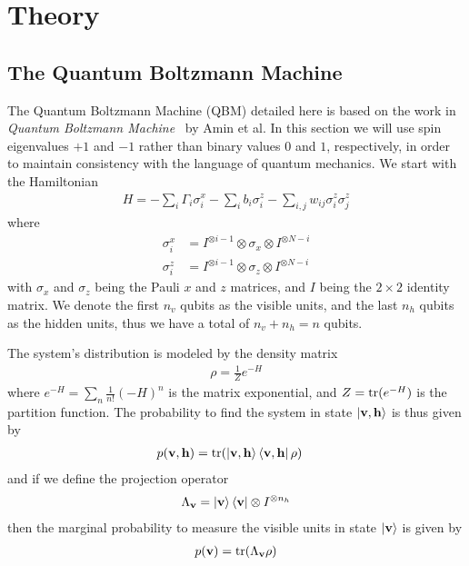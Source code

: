 \section{Theory}
\subsection{The Quantum Boltzmann Machine}
The Quantum Boltzmann Machine (QBM) detailed here is based on the work in \textit{Quantum Boltzmann Machine}~\cite{amin_2018} by Amin et al.
In this section we will use spin eigenvalues \( +1 \) and \( -1 \) rather than binary values \( 0 \) and \( 1 \), respectively, in order to maintain consistency with the language of quantum mechanics.
We start with the Hamiltonian
\begin{align}
    H = -\sum_i \Gamma_i \sigma_i^x -\sum_i b_i \sigma_i^z - \sum_{i,j} w_{ij} \sigma_i^z \sigma_j^z
\end{align}
where
\begin{align}
    \sigma_i^x
        &= I^{\otimes i-1} \otimes \sigma_x \otimes I^{\otimes N-i} \\
    \sigma_i^z
        &= I^{\otimes i-1} \otimes \sigma_z \otimes I^{\otimes N-i}
\end{align}
with \( \sigma_x \) and \( \sigma_z \) being the Pauli \( x \) and \( z \) matrices, and \( I \) being the \( 2 \times 2 \) identity matrix.
We denote the first \( n_v \) qubits as the visible units, and the last \( n_h \) qubits as the hidden units, thus we have a total of \( n_v + n_h = n \) qubits.

The system's distribution is modeled by the density matrix
\begin{align}
    \rho = \frac{1}{Z} e^{-H}
\end{align}
where \( e^{-H} = \sum_n \frac{1}{n!} (-H)^n \) is the matrix exponential, and \( Z = \text{tr}(e^{-H}) \) is the partition function.
The probability to find the system in state \( \ket{\mathbf{v},\mathbf{h}} \) is thus given by
\begin{align}
    p(\mathbf{v},\mathbf{h})
        &= \text{tr}(\ket{\mathbf{v},\mathbf{h}}\bra{\mathbf{v},\mathbf{h}} \rho)
\end{align}
and if we define the projection operator
\begin{align}
    \Lambda_{\mathbf{v}} = \ket{\mathbf{v}}\bra{\mathbf{v}} \otimes I^{\otimes n_h}
\end{align}
then the marginal probability to measure the visible units in state \( \ket{\mathbf{v}} \) is given by
\begin{align}
    p(\mathbf{v}) = \text{tr}(\Lambda_{\mathbf{v}}\rho)
\end{align}

